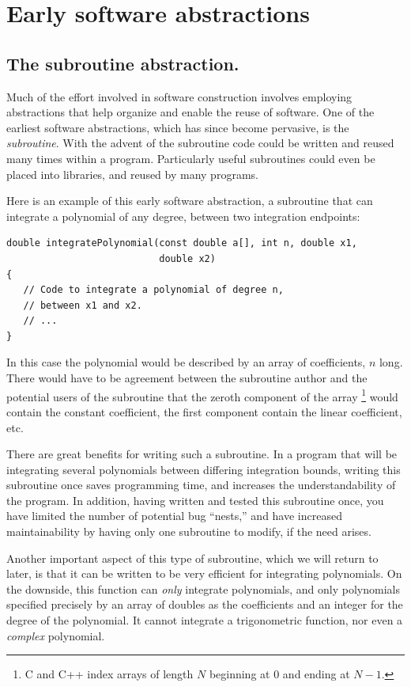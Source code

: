\documentclass[reqno]{lanl}
\begin{document}
\section{Early software abstractions}

\subsection{The subroutine abstraction.}
Much of the effort involved in software construction involves employing
abstractions that help organize and enable the reuse of software.
One of the earliest software abstractions, which has since become pervasive,
is the \emph{subroutine}.
With the 
advent of the subroutine code could be written and reused many times within
a program.
Particularly useful subroutines could even be placed into libraries,
and reused by many programs.

Here is an example of this early software abstraction, a subroutine
that can integrate a polynomial of any degree, between two integration
endpoints:
%
 \begin{verbatim}
double integratePolynomial(const double a[], int n, double x1,
                           double x2)
{
   // Code to integrate a polynomial of degree n,
   // between x1 and x2.
   // ...
}
\end{verbatim} \normalcolor
%
In this case the polynomial would be described by an array of coefficients,
$n$ long.
There would have to be agreement between
the subroutine author and the potential users of the subroutine
that the zeroth component of the array%
\footnote{C and C++ index arrays of length $N$
 beginning at $0$ and ending at $N-1$.}
would contain the constant coefficient, the first component contain
the linear coefficient, etc.

There are great benefits for writing such a subroutine.
In a program that will be integrating several polynomials between differing
integration bounds, writing this subroutine once saves programming time, 
and increases the understandability of the program.
In addition, having written and tested this subroutine once, you have limited
the number of potential bug ``nests,'' and have increased maintainability by
having only one subroutine to modify, if the need arises.

Another important aspect of this type of subroutine, which we will return
to later, is that it can be written to be very efficient for integrating
polynomials.
On the downside, this function can \emph{only}
 integrate polynomials, and only polynomials
specified precisely by an array of doubles as the coefficients and an integer
for the degree of the polynomial.
It cannot integrate a trigonometric function, 
nor even a \emph{complex} polynomial.
\end{document}
